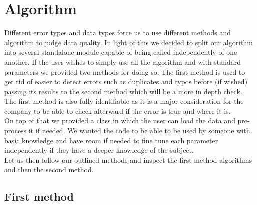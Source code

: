 \documentclass{article}
\begin{document}

\section{Algorithm} %
\label{sec:Algorithm}
Different error types and data types force us to use different methods and algorithm to judge data quality. In light of this we decided to split our algorithm into several standalone module capable of being called independently of one another.
If the user wishes to simply use all the algorithm and with standard parameters we provided two methods for doing so. The first method is used to get rid of easier to detect errors such as duplicates and typos before (if wished) passing its results to the second method which will be a more in depth check. The first method is also fully identifiable as it is a major consideration for the company to be able to check afterward if the error is true and where it is.\\
On top of that we provided a class in which the user can load the data and pre-process it if needed. We wanted the code to be able to be used by someone with basic knowledge and have room if needed to fine tune each parameter independently if they have a deeper knowledge of the subject.\\
Let us then follow our outlined methods and inspect the first method algorithms and then the second method.


\subsection{First method}
\end{document}
